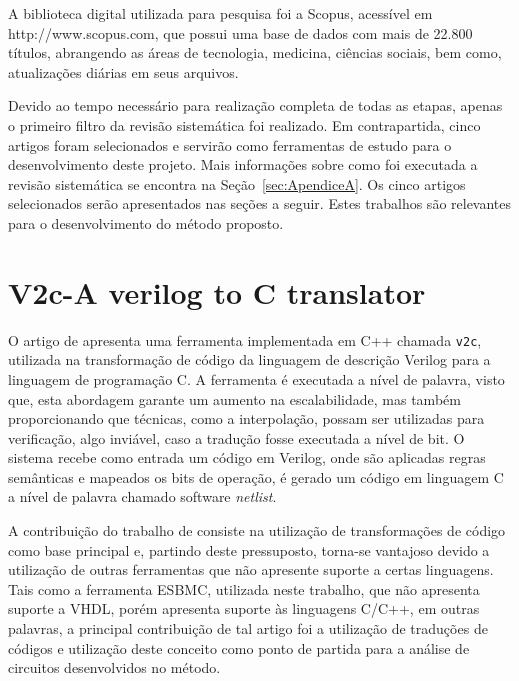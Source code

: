 \par
A biblioteca digital utilizada para pesquisa foi a Scopus, acessível em http://www.scopus.com, que possui uma base de dados com mais de 22.800 títulos, abrangendo as áreas de tecnologia, medicina, ciências sociais, bem como, atualizações diárias em seus arquivos.

\par
Devido ao tempo necessário para realização completa de todas as etapas, apenas o primeiro filtro da revisão sistemática foi realizado. Em contrapartida, cinco artigos foram selecionados e servirão como ferramentas de estudo para o desenvolvimento deste projeto. Mais informações sobre como foi executada a revisão sistemática se encontra na Seção~\ref{sec:ApendiceA}. Os cinco artigos selecionados serão apresentados nas seções a seguir. Estes trabalhos são relevantes para o desenvolvimento do método proposto. 

\section{V2c-A verilog to C translator}

O artigo de  apresenta uma ferramenta implementada em C++ chamada \texttt{v2c}, utilizada na transformação de código da linguagem de descrição Verilog para a linguagem de programação C. A ferramenta é executada a nível de palavra, visto que, esta abordagem garante um aumento na escalabilidade, mas também proporcionando que técnicas, como a interpolação\cite{beyer2011cpachecker}, possam ser utilizadas para verificação, algo inviável, caso a tradução fosse executada a nível de bit. O sistema recebe como entrada um código em Verilog, onde são aplicadas regras semânticas e mapeados os bits de operação, é gerado um código em linguagem C a nível de palavra chamado software \textit{netlist}.

\par
A contribuição do trabalho de  consiste na utilização de transformações de código como base principal e, partindo deste pressuposto, torna-se vantajoso devido a utilização de outras ferramentas que não apresente suporte a certas linguagens. Tais como a ferramenta ESBMC, utilizada neste trabalho, que não apresenta suporte a VHDL, porém apresenta suporte às linguagens C/C++, em outras palavras, a principal contribuição de tal artigo foi a utilização de traduções de códigos e utilização deste conceito como ponto de partida para a análise de circuitos desenvolvidos no método.

